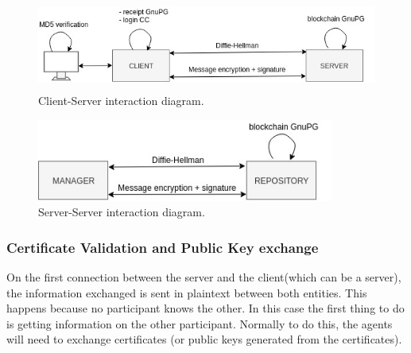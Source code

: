 \begin{figure}[H]
\center
\includegraphics[height=3cm]{sections/img/client-server.jpg}
\caption{Client-Server interaction diagram.}
\label{fig:clientserversecurity}
\end{figure}

\begin{figure}[H]
\center
\includegraphics[height=2.7cm]{sections/img/server-server.jpg}
\caption{Server-Server interaction diagram.}
\label{fig:serverserversecurity}
\end{figure}

\vspace*{5mm}

\subsubsection{Certificate Validation and Public Key exchange}
On the first connection between the server and the client(which can be a server), the information exchanged is sent in plaintext between both entities. This happens because no participant knows the other.
In this case the first thing to do is getting information on the other participant. Normally to do this, the agents will need to exchange certificates (or public keys generated from the certificates).

